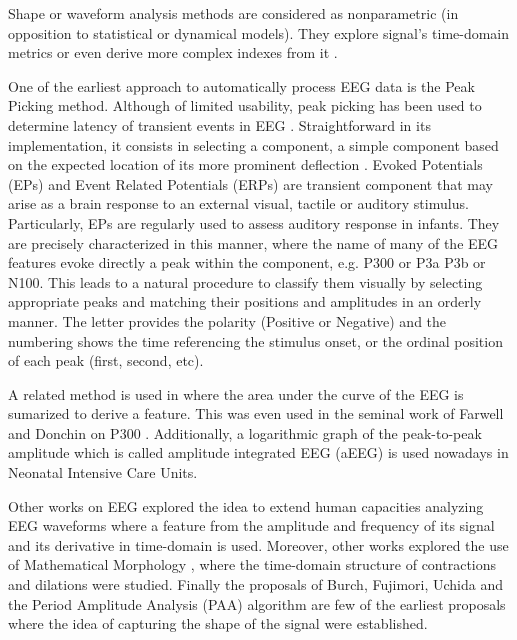 \documentclass[brainsci,article,submit,moreauthors,pdftex,10pt,a4paper]{mdpi}
\begin{document}
Shape or waveform analysis methods are considered as nonparametric (in opposition to statistical or dynamical models).  They explore signal's time-domain metrics or even derive more complex indexes from it \citep{Thakor2009}. 

One of the earliest approach to automatically process EEG data is the Peak Picking method.  Although of limited usability, peak picking has been used to determine latency of transient events in EEG \citep{Jaskowski2000,Zhang2011}.  Straightforward in its implementation, it consists in selecting a component, a simple component based on the expected location of its more prominent deflection \citep{Ouyang2017}.  Evoked Potentials (EPs) and Event Related Potentials (ERPs) are transient component that may arise as a brain response to an external visual, tactile or auditory stimulus.  Particularly, EPs are regularly used to assess auditory response in infants. They are precisely characterized in this manner, where the name of many of the EEG features evoke directly a peak within the component, e.g. P300 or P3a P3b or N100.  This leads to a natural procedure to classify them visually by selecting appropriate peaks and matching their positions and amplitudes in an orderly manner.  The letter provides the polarity (Positive or Negative) and the numbering shows the time referencing the stimulus onset, or the ordinal position of each peak (first, second, etc).   

A related method is used in \citep{Alvarado-Gonzalez2016} where the area under the curve of the EEG is sumarized to derive a feature.  This was even used in the seminal work of Farwell and Donchin on P300 \citep{Farwell1988,WolpawJonathanR2012}. Additionally, a logarithmic graph of the peak-to-peak amplitude which is called amplitude integrated EEG (aEEG) \citep{Shah2015} is used nowadays in Neonatal Intensive Care Units.

Other works on EEG explored the idea to extend human capacities analyzing EEG waveforms \citep{Klein1976} where a feature from the amplitude and frequency of its signal and its derivative in time-domain is used.  Moreover, other works explored the use of Mathematical Morphology \citep{Yamaguchi2009}, where the time-domain structure of contractions and dilations were studied. Finally the proposals of Burch, Fujimori, Uchida and the Period Amplitude Analysis (PAA) \citep{Uchida1996} algorithm are few of the earliest proposals where the idea of capturing the shape of the signal were established.

\end{document}
